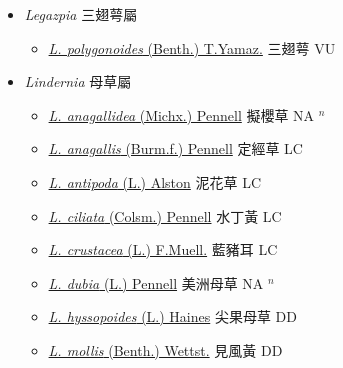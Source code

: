 
  \begin{itemize}
 \item[] \textit{Legazpia} 三翅萼屬
                    
  \begin{itemize}
        \item[] \href{http://www.theplantlist.org/tpl1.1/search?q=Legazpia+polygonoides}{\textit{L. polygonoides} (Benth.) T.Yamaz.}   三翅萼 VU
  \end{itemize}
 \item[] \textit{Lindernia} 母草屬
                    
  \begin{itemize}
        \item[] \href{http://www.theplantlist.org/tpl1.1/search?q=Lindernia+anagallidea}{\textit{L. anagallidea} (Michx.) Pennell}   擬櫻草 NA $^n$
        \item[] \href{http://www.theplantlist.org/tpl1.1/search?q=Lindernia+anagallis}{\textit{L. anagallis} (Burm.f.) Pennell}   定經草 LC
        \item[] \href{http://www.theplantlist.org/tpl1.1/search?q=Lindernia+antipoda}{\textit{L. antipoda} (L.) Alston}   泥花草 LC
        \item[] \href{http://www.theplantlist.org/tpl1.1/search?q=Lindernia+ciliata}{\textit{L. ciliata} (Colsm.) Pennell}   水丁黃 LC
        \item[] \href{http://www.theplantlist.org/tpl1.1/search?q=Lindernia+crustacea}{\textit{L. crustacea} (L.) F.Muell.}   藍豬耳 LC
        \item[] \href{http://www.theplantlist.org/tpl1.1/search?q=Lindernia+dubia}{\textit{L. dubia} (L.) Pennell}   美洲母草 NA $^n$
        \item[] \href{http://www.theplantlist.org/tpl1.1/search?q=Lindernia+hyssopoides}{\textit{L. hyssopoides} (L.) Haines}   尖果母草 DD
        \item[] \href{http://www.theplantlist.org/tpl1.1/search?q=Lindernia+mollis}{\textit{L. mollis} (Benth.) Wettst.}   見風黃 DD

\end{itemize}
\end{itemize}
